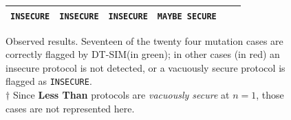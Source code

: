 \documentclass[acmlarge, manuscript, screen, review, anonymous, table]{acmart}
\newcommand{\highlight}[2]{\colorbox{#1}{#2}}
\newcommand{\toolname}{\textsc{DT-SIM}\xspace}
\begin{document}
\begin{figure}
\begin{tabular}{| r r | c : c : c : c|}
\begin{minipage}[t][][c]{0.204\textwidth}
          \texttt{INSECURE}
        \end{minipage}
      & \begin{minipage}[t][][c]{0.204\textwidth}
          \texttt{INSECURE}
        \end{minipage}
      & \begin{minipage}[t][][c]{0.204\textwidth}
          \texttt{INSECURE}
        \end{minipage}
      & \begin{minipage}[t][][c]{0.204\textwidth}
          \texttt{MAYBE SECURE}
        \end{minipage}
      \\
    \hline
  \end{tabular}
  \bigskip
  \caption{Observed results.
  Seventeen of the twenty four mutation cases are correctly flagged by \toolname (\highlight{correct}{in green});
  in other cases (\highlight{incorrect}{in red}) an insecure protocol is not detected, or a vacuously secure protocol is flagged as \texttt{INSECURE}.\\
  \footnotesize{$\dagger$ Since \textbf{Less Than} protocols are \emph{vacuously secure} at $n=1$, those cases are not represented here.}}
  \label{fig:observations}
\end{figure}
\end{document}
